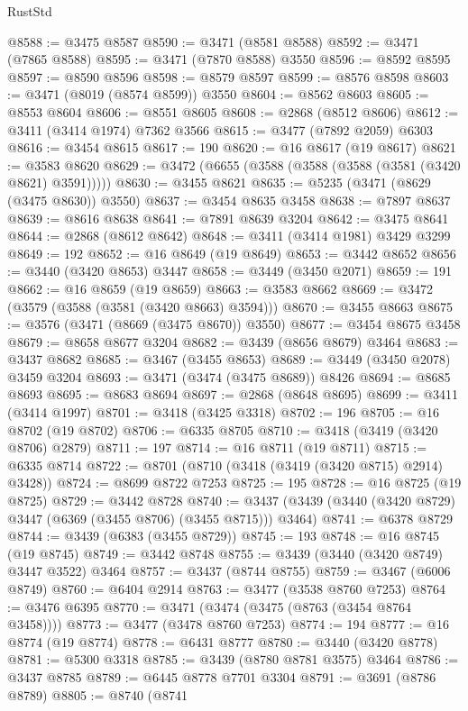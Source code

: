 \begin{lexlean}{RustStd}
\begin{coremodule}
{{{{{{{{{{{{{{{{{{{@8588 := @3475 @8587
@8590 := @3471 (@8581 @8588)
@8592 := @3471 (@7865 @8588)
@8595 := @3471 (@7870 @8588) @3550
@8596 := @8592 @8595
@8597 := @8590 @8596
@8598 := @8579 @8597
@8599 := @8576 @8598
@8603 := @3471 (@8019 (@8574 @8599)) @3550
@8604 := @8562 @8603
@8605 := @8553 @8604
@8606 := @8551 @8605
@8608 := @2868 (@8512 @8606)
@8612 := @3411 (@3414 @1974) @7362 @3566
@8615 := @3477 (@7892 @2059) @6303
@8616 := @3454 @8615
@8617 := 190
@8620 := @16 @8617 (@19 @8617)
@8621 := @3583 @8620
@8629 := @3472 (@6655 (@3588 (@3588 (@3588 (@3581 (@3420 @8621) @3591)))))
@8630 := @3455 @8621
@8635 := @5235 (@3471 (@8629 (@3475 @8630)) @3550)
@8637 := @3454 @8635 @3458
@8638 := @7897 @8637
@8639 := @8616 @8638
@8641 := @7891 @8639 @3204
@8642 := @3475 @8641
@8644 := @2868 (@8612 @8642)
@8648 := @3411 (@3414 @1981) @3429 @3299
@8649 := 192
@8652 := @16 @8649 (@19 @8649)
@8653 := @3442 @8652
@8656 := @3440 (@3420 @8653) @3447
@8658 := @3449 (@3450 @2071)
@8659 := 191
@8662 := @16 @8659 (@19 @8659)
@8663 := @3583 @8662
@8669 := @3472 (@3579 (@3588 (@3581 (@3420 @8663) @3594)))
@8670 := @3455 @8663
@8675 := @3576 (@3471 (@8669 (@3475 @8670)) @3550)
@8677 := @3454 @8675 @3458
@8679 := @8658 @8677 @3204
@8682 := @3439 (@8656 @8679) @3464
@8683 := @3437 @8682
@8685 := @3467 (@3455 @8653)
@8689 := @3449 (@3450 @2078) @3459 @3204
@8693 := @3471 (@3474 (@3475 @8689)) @8426
@8694 := @8685 @8693
@8695 := @8683 @8694
@8697 := @2868 (@8648 @8695)
@8699 := @3411 (@3414 @1997)
@8701 := @3418 (@3425 @3318)
@8702 := 196
@8705 := @16 @8702 (@19 @8702)
@8706 := @6335 @8705
@8710 := @3418 (@3419 (@3420 @8706) @2879)
@8711 := 197
@8714 := @16 @8711 (@19 @8711)
@8715 := @6335 @8714
@8722 := @8701 (@8710 (@3418 (@3419 (@3420 @8715) @2914) @3428))
@8724 := @8699 @8722 @7253
@8725 := 195
@8728 := @16 @8725 (@19 @8725)
@8729 := @3442 @8728
@8740 := @3437 (@3439 (@3440 (@3420 @8729) @3447 (@6369 (@3455 @8706) (@3455 @8715))) @3464)
@8741 := @6378 @8729
@8744 := @3439 (@6383 (@3455 @8729))
@8745 := 193
@8748 := @16 @8745 (@19 @8745)
@8749 := @3442 @8748
@8755 := @3439 (@3440 (@3420 @8749) @3447 @3522) @3464
@8757 := @3437 (@8744 @8755)
@8759 := @3467 (@6006 @8749)
@8760 := @6404 @2914
@8763 := @3477 (@3538 @8760 @7253)
@8764 := @3476 @6395
@8770 := @3471 (@3474 (@3475 (@8763 (@3454 @8764 @3458))))
@8773 := @3477 (@3478 @8760 @7253)
@8774 := 194
@8777 := @16 @8774 (@19 @8774)
@8778 := @6431 @8777
@8780 := @3440 (@3420 @8778)
@8781 := @5300 @3318
@8785 := @3439 (@8780 @8781 @3575) @3464
@8786 := @3437 @8785
@8789 := @6445 @8778 @7701 @3304
@8791 := @3691 (@8786 @8789)
@8805 := @8740
    (@8741
}}}}}}}}}}}}}}}}}}}
\end{coremodule}
\end{lexlean}

